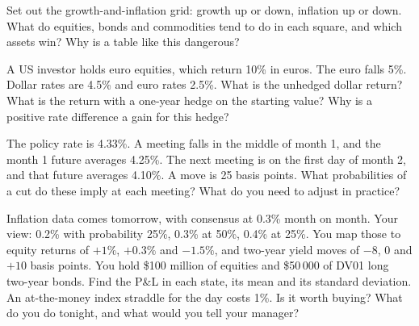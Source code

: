 \begin{question}\label{iq:iv2:macro-market-knowledge-and-pitches:22}
Set out the growth-and-inflation grid: growth up or down, inflation up or down. What do equities, bonds and commodities tend to do in each square, and which assets win? Why is a table like this dangerous?
\end{question}

\begin{question}\label{iq:iv2:macro-market-knowledge-and-pitches:23}
A US investor holds euro equities, which return 10\% in euros. The euro falls 5\%. Dollar rates are 4.5\% and euro rates 2.5\%. What is the unhedged dollar return? What is the return with a one-year hedge on the starting value? Why is a positive rate difference a gain for this hedge?
\end{question}

\begin{question}\label{iq:iv2:macro-market-knowledge-and-pitches:24}
The policy rate is 4.33\%. A meeting falls in the middle of month 1, and the month 1 future averages 4.25\%. The next meeting is on the first day of month 2, and that future averages 4.10\%. A move is 25 basis points. What probabilities of a cut do these imply at each meeting? What do you need to adjust in practice?
\end{question}

\begin{question}\label{iq:iv2:macro-market-knowledge-and-pitches:25}
Inflation data comes tomorrow, with consensus at 0.3\% month on month. Your view: 0.2\% with probability 25\%, 0.3\% at 50\%, 0.4\% at 25\%. You map those to equity returns of $+1\%$, $+0.3\%$ and $-1.5\%$, and two-year yield moves of $-8$, 0 and $+10$ basis points. You hold \$100 million of equities and \$50\,000 of DV01 long two-year bonds. Find the P\&L in each state, its mean and its standard deviation. An at-the-money index straddle for the day costs 1\%. Is it worth buying? What do you do tonight, and what would you tell your manager?
\end{question}
